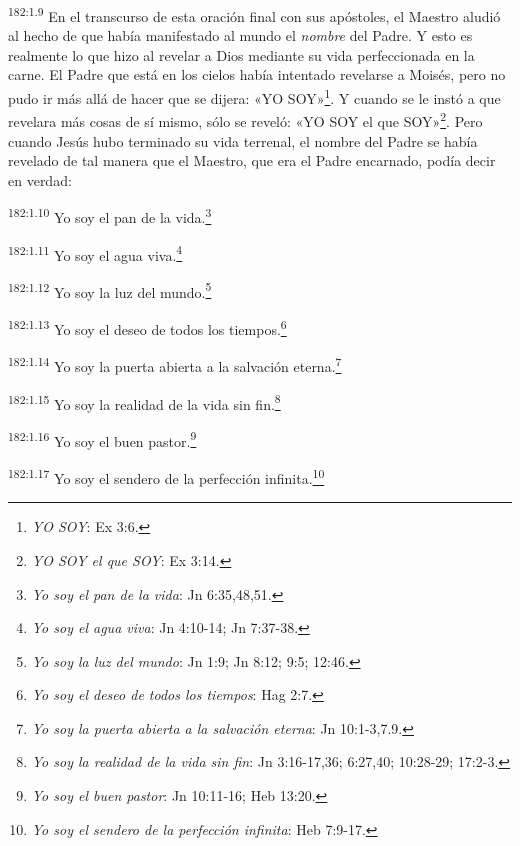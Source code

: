 \par 
\textsuperscript{182:1.9} En el transcurso de esta oración final con sus apóstoles, el Maestro aludió al hecho de que había manifestado al mundo el \textit{nombre} del Padre. Y esto es realmente lo que hizo al revelar a Dios mediante su vida perfeccionada en la carne. El Padre que está en los cielos había intentado revelarse a Moisés, pero no pudo ir más allá de hacer que se dijera: «YO SOY»\footnote{\textit{YO SOY}: Ex 3:6.}. Y cuando se le instó a que revelara más cosas de sí mismo, sólo se reveló: «YO SOY el que SOY»\footnote{\textit{YO SOY el que SOY}: Ex 3:14.}. Pero cuando Jesús hubo terminado su vida terrenal, el nombre del Padre se había revelado de tal manera que el Maestro, que era el Padre encarnado, podía decir en verdad:

\par 
\textsuperscript{182:1.10} Yo soy el pan de la vida.\footnote{\textit{Yo soy el pan de la vida}: Jn 6:35,48,51.}

\par 
\textsuperscript{182:1.11} Yo soy el agua viva.\footnote{\textit{Yo soy el agua viva}: Jn 4:10-14; Jn 7:37-38.}

\par 
\textsuperscript{182:1.12} Yo soy la luz del mundo.\footnote{\textit{Yo soy la luz del mundo}: Jn 1:9; Jn 8:12; 9:5; 12:46.}

\par 
\textsuperscript{182:1.13} Yo soy el deseo de todos los tiempos.\footnote{\textit{Yo soy el deseo de todos los tiempos}: Hag 2:7.}

\par 
\textsuperscript{182:1.14} Yo soy la puerta abierta a la salvación eterna.\footnote{\textit{Yo soy la puerta abierta a la salvación eterna}: Jn 10:1-3,7.9.}

\par 
\textsuperscript{182:1.15} Yo soy la realidad de la vida sin fin.\footnote{\textit{Yo soy la realidad de la vida sin fin}: Jn 3:16-17,36; 6:27,40; 10:28-29; 17:2-3.}

\par 
\textsuperscript{182:1.16} Yo soy el buen pastor.\footnote{\textit{Yo soy el buen pastor}: Jn 10:11-16; Heb 13:20.}

\par 
\textsuperscript{182:1.17} Yo soy el sendero de la perfección infinita.\footnote{\textit{Yo soy el sendero de la perfección infinita}: Heb 7:9-17.}

